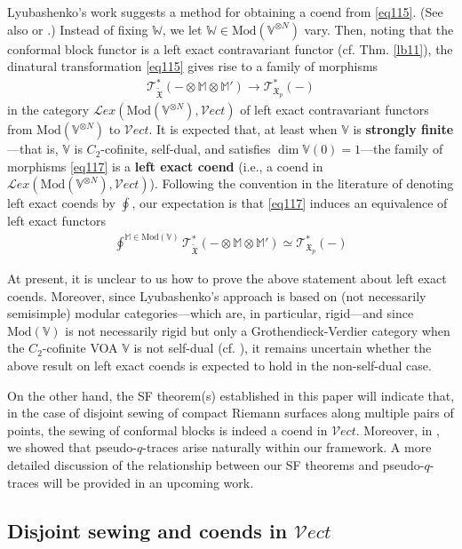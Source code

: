 \documentclass[11pt,b5paper,notitlepage]{article}
\theoremstyle{definition}
\theoremstyle{plain}
\newcommand{\Vect}{\mathcal Vect}
\newcommand{\Vbb}{\mathbb V}
\newcommand{\Wbb}{\mathbb W}
\newcommand{\Mbb}{\mathbb M}
\newcommand{\<}{\left\langle}
\renewcommand{\>}{\right\rangle}
\newcommand{\fx}{\mathfrak{X}}
\newcommand{\ST}{\mathscr{T}}
\newcommand{\Mod}{\mathrm{Mod}}
\newcommand{\fxtd}{{\widetilde{\mathfrak X}}}
\newcommand{\Lex}{{\mathcal Lex}}
\numberwithin{equation}{section}
\begin{document}
Lyubashenko's work \cite{Lyu96-Ribbon} suggests a method for obtaining a coend from \eqref{eq115}. (See also \cite[Prop. 9]{FS-coends-CFT} or \cite[Prop. 4.8]{HR24-MF}.) Instead of fixing $\Wbb$, we let $\Wbb\in\Mod(\Vbb^{\otimes N})$ vary. Then, noting that the conformal block functor is a left exact contravariant functor (cf. Thm. \ref{lb11}), the dinatural transformation \eqref{eq115} gives rise to a family of morphisms
\begin{align}\label{eq117}
\ST^*_\fxtd(-\otimes\Mbb\otimes\Mbb')\rightarrow\ST^*_{\fx_p}(-)
\end{align}
in the category $\Lex(\Mod(\Vbb^{\otimes N}),\Vect)$ of left exact contravariant functors from $\Mod(\Vbb^{\otimes N})$ to $\Vect$. It is expected that, at least when $\Vbb$ is \textbf{strongly finite}---that is, $\Vbb$ is $C_2$-cofinite, self-dual, and satisfies $\dim\Vbb(0)=1$---the family of morphisms \eqref{eq117} is a \textbf{left exact coend} (i.e., a coend in $\Lex(\Mod(\Vbb^{\otimes N}),\Vect)$). Following the convention in the literature of denoting left exact coends by $\oint$, our expectation is that \eqref{eq117} induces an equivalence of left exact functors
\begin{align*}
\oint\nolimits^{\Mbb\in\Mod(\Vbb)}\ST^*_\fxtd(-\otimes\Mbb\otimes\Mbb')\simeq\ST^*_{\fx_p}(-)
\end{align*}


At present, it is unclear to us how to prove the above statement about left exact coends. Moreover, since Lyubashenko's approach is based on (not necessarily semisimple) modular categories---which are, in particular, rigid---and since $\Mod(\Vbb)$ is not necessarily rigid but only a Grothendieck-Verdier category when the $C_2$-cofinite VOA $\Vbb$ is not self-dual (cf. \cite{ALSW21}), it remains uncertain whether the above result on left exact coends is expected to hold in the non-self-dual case.



On the other hand, the SF theorem(s) established in this paper will indicate that, in the case of disjoint sewing of compact Riemann surfaces along multiple pairs of points, the sewing of conformal blocks is indeed a coend in $\Vect$. Moreover, in \cite{GZ2}, we showed that pseudo-$q$-traces arise naturally within our framework. A more detailed discussion of the relationship between our SF theorems and pseudo-$q$-traces will be provided in an upcoming work. 




\subsection{Disjoint sewing and coends in $\Vect$}
\end{document}
